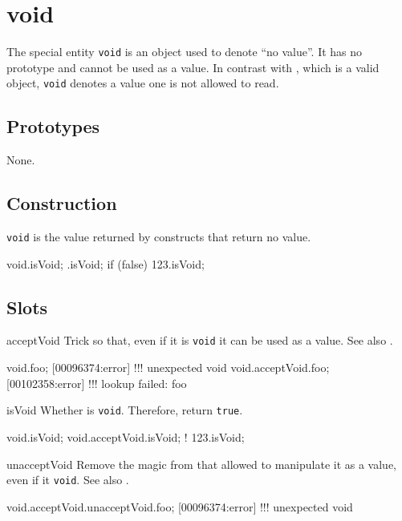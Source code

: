 
\section{void}

The special entity \lstinline|void| is an object used to denote ``no
value''.  It has no prototype and cannot be used as a value.  In contrast
with , which is a valid object, \lstinline|void| denotes a
value one is not allowed to read.

\subsection{Prototypes}

None.

\subsection{Construction}

\lstinline|void| is the value returned by constructs that return no value.

\begin{urbiassert}[firstnumber=1]
void.isVoid;
{}.isVoid;
{if (false) 123}.isVoid;
\end{urbiassert}

\subsection{Slots}

\begin{urbiscriptapi}
\item[acceptVoid]%
  Trick \this so that, even if it is \lstinline|void| it can be used as a
  value.  See also .
\begin{urbiscript}
void.foo;
[00096374:error] !!! unexpected void
void.acceptVoid.foo;
[00102358:error] !!! lookup failed: foo
\end{urbiscript}

\item[isVoid]%
  Whether \this is \lstinline|void|.  Therefore, return \lstinline|true|.
\begin{urbiassert}
void.isVoid;
void.acceptVoid.isVoid;
! 123.isVoid;
\end{urbiassert}

\item[unacceptVoid]%
  Remove the magic from \this that allowed to manipulate it as a value, even
  if it \lstinline|void|.  See also .
\begin{urbiscript}
void.acceptVoid.unacceptVoid.foo;
[00096374:error] !!! unexpected void
\end{urbiscript}

\end{urbiscriptapi}




